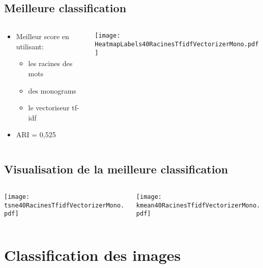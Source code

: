 \documentclass[8pt,aspectratio=169,hyperref={unicode=true}]{beamer}
\begin{document}
\subsection{Meilleure classification}
\begin{frame}{\insertsubsection}
    \begin{columns}
        \begin{column}{.4\textwidth}
            \begin{itemize}
                \item Meilleur score en utilisant:
                      \begin{itemize}
                          \item les racines des mots
                          \item des monograms
                          \item le vectoriseur tf-idf
                      \end{itemize}
                \item ARI = 0,525
            \end{itemize}
        \end{column}
        \begin{column}{.6\textwidth}
            \texttt{[image: HeatmapLabels40RacinesTfidfVectorizerMono.pdf]}
        \end{column}
    \end{columns}
\end{frame}

\subsection{Visualisation de la meilleure classification}
\begin{frame}{\insertsubsection}
    \begin{columns}
        \begin{column}{.5\textwidth}
            \texttt{[image: tsne40RacinesTfidfVectorizerMono.pdf]}
        \end{column}
        \begin{column}{.5\textwidth}
            \texttt{[image: kmean40RacinesTfidfVectorizerMono.pdf]}
        \end{column}
    \end{columns}
\end{frame}

\section{Classification des images}
\end{document}
